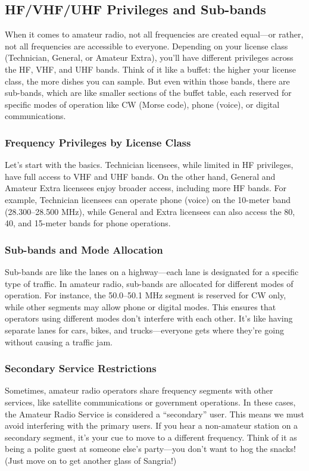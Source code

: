 \subsection{HF/VHF/UHF Privileges and Sub-bands}
\label{subsec:freq-privs}

When it comes to amateur radio, not all frequencies are created equal—or rather, not all frequencies are accessible to everyone. Depending on your license class (Technician, General, or Amateur Extra), you’ll have different privileges across the HF, VHF, and UHF bands. Think of it like a buffet: the higher your license class, the more dishes you can sample. But even within those bands, there are sub-bands, which are like smaller sections of the buffet table, each reserved for specific modes of operation like CW (Morse code), phone (voice), or digital communications.

\subsubsection*{Frequency Privileges by License Class}
Let’s start with the basics. Technician licensees, while limited in HF privileges, have full access to VHF and UHF bands. On the other hand, General and Amateur Extra licensees enjoy broader access, including more HF bands. For example, Technician licensees can operate phone (voice) on the 10-meter band (28.300–28.500 MHz), while General and Extra licensees can also access the 80, 40, and 15-meter bands for phone operations. 

\subsubsection*{Sub-bands and Mode Allocation}
Sub-bands are like the lanes on a highway—each lane is designated for a specific type of traffic. In amateur radio, sub-bands are allocated for different modes of operation. For instance, the 50.0–50.1 MHz segment is reserved for CW only, while other segments may allow phone or digital modes. This ensures that operators using different modes don’t interfere with each other. It’s like having separate lanes for cars, bikes, and trucks—everyone gets where they’re going without causing a traffic jam.

\subsubsection*{Secondary Service Restrictions}
Sometimes, amateur radio operators share frequency segments with other services, like satellite communications or government operations. In these cases, the Amateur Radio Service is considered a “secondary” user. This means we must avoid interfering with the primary users. If you hear a non-amateur station on a secondary segment, it’s your cue to move to a different frequency. Think of it as being a polite guest at someone else’s party—you don’t want to hog the snacks! (Just move on to get another glass of Sangria!)


